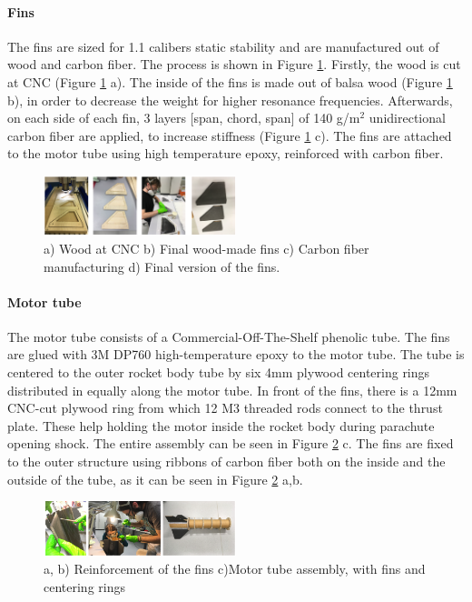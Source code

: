 \paragraph{Fins}
\hfill \break
    The fins are sized for 1.1 calibers static stability %
    and are manufactured out of wood and carbon fiber. The process is shown in Figure \ref{f:fins}. Firstly, the wood is cut at CNC (Figure \ref{f:fins} a). The inside of the fins is made out of balsa wood (Figure \ref{f:fins} b), in order to decrease the weight for higher resonance frequencies. Afterwards, on each side of each fin, 3 layers [span, chord, span] of 140 g/m$^2$ unidirectional carbon fiber are applied, to increase stiffness (Figure \ref{f:fins} c). The fins are attached to the motor tube using high temperature epoxy, reinforced with carbon fiber.
    \begin{figure}[h!]
        \centering
        \includegraphics[width=0.5\textwidth]{img/fins.png}
        \caption{a) Wood at CNC b) Final wood-made fins c) Carbon fiber manufacturing d) Final version of the fins.}
        \label{f:fins}
    \end{figure}


\paragraph{Motor tube}
\hfill \break
The motor tube consists of a Commercial-Off-The-Shelf phenolic tube. The fins are glued with 3M DP760 high-temperature epoxy to the motor tube. The tube is centered to the outer rocket body tube by six 4mm plywood centering rings distributed in equally along the motor tube.
In front of the fins, there is a 12mm CNC-cut plywood ring from which 12 M3 threaded rods connect to the thrust plate. These help holding the motor inside the rocket body during parachute opening shock.
The entire assembly can be seen in Figure \ref{f:reinforcement} c. The fins are fixed to the outer structure using ribbons of carbon fiber both on the inside and the outside of the tube, as it can be seen in Figure \ref{f:reinforcement} a,b.

  \begin{figure}[h!]
\centering
\includegraphics[width=0.5\textwidth]{img/fins_glue.png}
\caption{a, b) Reinforcement of the fins c)Motor tube assembly, with fins and centering rings}
\label{f:reinforcement}
\end{figure}



